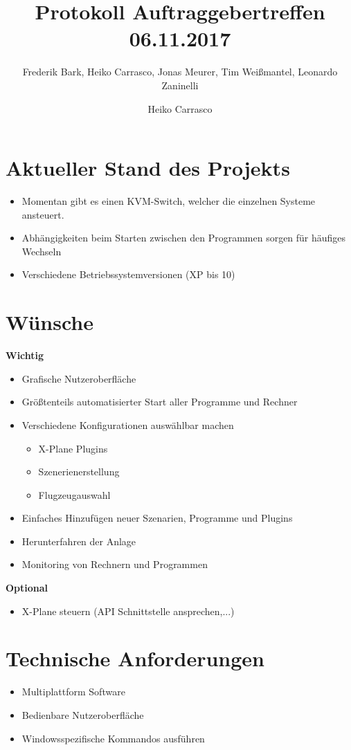 \documentclass[colorback, accentcolor=tud1c, paper=a4, nochapname]{tudexercise}
\title{Protokoll Auftraggebertreffen 06.11.2017}
\subtitle{Frederik Bark, Heiko Carrasco, Jonas Meurer, Tim Weißmantel, Leonardo Zaninelli}
\author{Heiko Carrasco}
\begin{document}
\maketitle

\section{Aktueller Stand des Projekts}

\begin{itemize}
	\item Momentan gibt es einen KVM-Switch, welcher die einzelnen Systeme ansteuert.
	\item Abhängigkeiten beim Starten zwischen den Programmen sorgen für häufiges Wechseln
	\item Verschiedene Betriebssystemversionen (XP bis 10)

\end{itemize}

\section{Wünsche}
\textbf{Wichtig}
\begin{itemize}
	\item Grafische Nutzeroberfläche
	\item Größtenteils automatisierter Start aller Programme und Rechner
	\item Verschiedene Konfigurationen auswählbar machen
		\begin{itemize}
			\item X-Plane Plugins
			\item Szenerienerstellung
			\item Flugzeugauswahl
		\end{itemize}
	\item Einfaches Hinzufügen neuer Szenarien, Programme und Plugins
	\item Herunterfahren der Anlage
	\item Monitoring von Rechnern und Programmen
\end{itemize}

\textbf{Optional}
\begin{itemize}
	\item X-Plane steuern (API Schnittstelle ansprechen,...)
\end{itemize}

\section{Technische Anforderungen}
\begin{itemize}
	\item Multiplattform Software
	\item Bedienbare Nutzeroberfläche
	\item Windowsspezifische Kommandos ausführen
\end{itemize}
\end{document}
